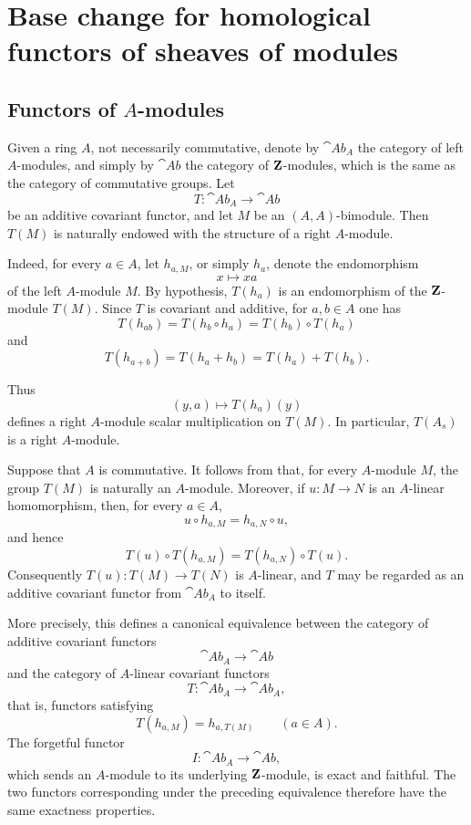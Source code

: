 \section{Base change for homological functors of sheaves of modules}
\label{section:III.7}


\subsection{Functors of $A$-modules}
\label{subsection:III.7.1}

\begin{env}[7.1.1]
\label{III.7.1.1}
Given a ring $A$, not necessarily commutative, denote by
$\cat{Ab}_A$ the category of left $A$-modules, and simply by
$\cat{Ab}$ the category of $\mathbf{Z}$-modules, which is the same
as the category of commutative groups.  Let
\[
  T:\cat{Ab}_A\longrightarrow\cat{Ab}
\]
be an additive covariant functor, and let $M$ be an
$(A,A)$-bimodule.  Then $T(M)$ is naturally endowed with the
structure of a right $A$-module.

Indeed, for every $a\in A$, let $h_{a,M}$, or simply $h_a$,
denote the endomorphism
\[
  x\longmapsto xa
\]
of the left $A$-module $M$.  By hypothesis, $T(h_a)$ is an
endomorphism of the $\mathbf{Z}$-module $T(M)$.  Since $T$ is
covariant and additive, for $a,b\in A$ one has
\[
  T(h_{ab})
  =
  T(h_b\circ h_a)
  =
  T(h_b)\circ T(h_a)
\]
and
\[
  T(h_{a+b})
  =
  T(h_a+h_b)
  =
  T(h_a)+T(h_b).
\]
\par\medskip\noindent Thus
\[
  (y,a)\longmapsto T(h_a)(y)
\]
defines a right $A$-module scalar multiplication on $T(M)$.
In particular, $T(A_s)$ is a right $A$-module.
\end{env}

\begin{env}[7.1.2]
\label{III.7.1.2}
Suppose that $A$ is commutative.  It follows from
 that, for every $A$-module $M$, the group
$T(M)$ is naturally an $A$-module.  Moreover, if
$u:M\to N$ is an $A$-linear homomorphism, then, for every
$a\in A$,
\[
  u\circ h_{a,M}=h_{a,N}\circ u,
\]
and hence
\[
  T(u)\circ T(h_{a,M})
  =
  T(h_{a,N})\circ T(u).
\]
Consequently $T(u):T(M)\to T(N)$ is $A$-linear, and $T$ may be
regarded as an additive covariant functor from $\cat{Ab}_A$ to
itself.

More precisely, this defines a canonical equivalence between
the category of additive covariant functors
\[
  \cat{Ab}_A\longrightarrow\cat{Ab}
\]
and the category of $A$-linear covariant functors
\[
  T:\cat{Ab}_A\longrightarrow\cat{Ab}_A,
\]
that is, functors satisfying
\[
  T(h_{a,M})=h_{a,T(M)}
  \qquad(a\in A).
\]
The forgetful functor
\[
  I:\cat{Ab}_A\longrightarrow\cat{Ab},
\]
which sends an $A$-module to its underlying $\mathbf{Z}$-module, is
exact and faithful.  The two functors corresponding under the
preceding equivalence therefore have the same exactness
properties.
\end{env}

